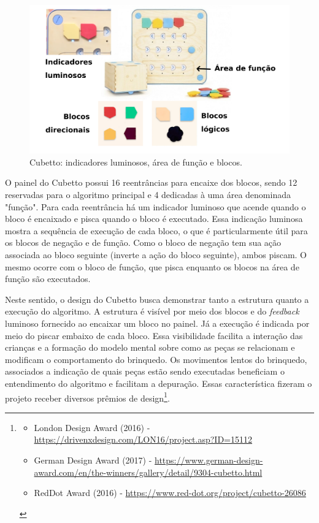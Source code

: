 \begin{figure}
    \centering
    \includegraphics[width=.7\linewidth,fbox]{figs/cubetto_blocks.png}
    \caption{Cubetto: indicadores luminosos, área de função e blocos.}
    \label{fig:cubetto_features}
\end{figure}

O painel do Cubetto possui 16 reentrâncias para encaixe dos blocos, sendo 12 reservadas para o algoritmo principal e 4 dedicadas à uma área denominada "função". Para cada reentrância
há um indicador luminoso que acende quando o bloco é encaixado e pisca quando o bloco é executado. Essa indicação luminosa mostra a sequência de execução de cada bloco, o que é particularmente útil para os blocos de negação e de função. Como o bloco de negação tem sua ação associada ao bloco seguinte (inverte a ação do bloco seguinte), ambos piscam. O mesmo ocorre com o bloco de função, que pisca enquanto os blocos na área de função são executados.

Neste sentido, o design do Cubetto busca demonstrar tanto a estrutura quanto a execução do algoritmo. A estrutura é visível por meio dos blocos e do \textit{feedback} luminoso fornecido ao encaixar um bloco no painel. Já a execução é indicada por meio do piscar embaixo de cada bloco. Essa visibilidade facilita a interação das crianças e a formação do modelo mental sobre como as peças se relacionam e modificam o comportamento do brinquedo. Os movimentos lentos do brinquedo, associados a indicação de quais peças estão sendo executadas beneficiam o entendimento do algoritmo e facilitam a depuração. Essas característica fizeram o projeto receber diversos prêmios de design\footnote{
\begin{itemize}
    \item London Design Award (2016) - \url{https://drivenxdesign.com/LON16/project.asp?ID=15112}
    \item German Design Award (2017) - \url{https://www.german-design-award.com/en/the-winners/gallery/detail/9304-cubetto.html}
    \item RedDot Award (2016) - \url{https://www.red-dot.org/project/cubetto-26086}
\end{itemize}
}.

